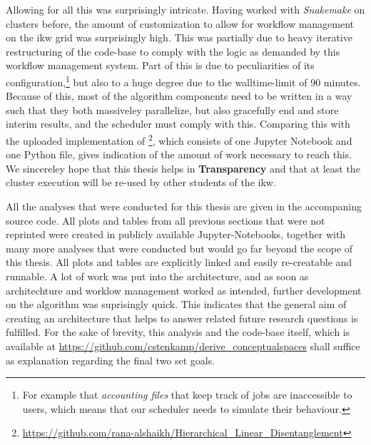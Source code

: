 Allowing for all this was surprisingly intricate. Having worked with \textit{Snakemake} on clusters before, the amount of customization to allow for workflow management on the \gls{ikw} grid was surprisingly high. This was partially due to heavy iterative restructuring of the code-base to comply with the logic as demanded by this workflow management system. Part of this is due to peculiarities of its configuration,\footnote{For example that \textit{accounting files} that keep track of jobs are inaccessible to users, which means that our scheduler needs to simulate their behaviour.} but also to a huge degree due to the walltime-limit of 90 minutes. Because of this, most of the algorithm components need to be written in a way such that they both massiveley parallelize, but also gracefully end and store interim results, and the scheduler must comply with this. Comparing this with the uploaded implementation of \cite{Alshaikh2020}\footnote{\url{https://github.com/rana-alshaikh/Hierarchical_Linear_Disentanglement}}, which consists of one Jupyter Notebook and one Python file, gives indication of the amount of work necessary to reach this. We sincereley hope that this thesis helps in \textbf{Transparency} and that at least the cluster execution will be re-used by other students of the \gls{ikw}.

All the analyses that were conducted for this thesis are given in the accompaning source code. All plots and tables from all previous sections that were not reprinted were created in publicly available Jupyter-Notebooks, together with many more analyses that were conducted but would go far beyond the scope of this thesis. All plots and tables are explicitly linked and easily re-creatable and runnable. A lot of work was put into the architecture, and as soon as architechture and worklow management worked as intended, further development on the algorithm was suprisingly quick. This indicates that the general aim of creating an architecture that helps to answer related future research questions is fulfilled. For the sake of brevity, this analysis and the code-base itself, which is available at \url{https://github.com/cstenkamp/derive_conceptualspaces} shall suffice as explanation regarding the final two set goals. 



